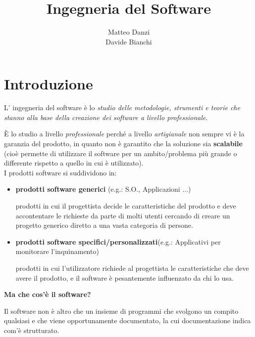\documentclass[a4paper, 10pt]{article}
\title{Ingegneria del Software}
\date{}
\author{Matteo Danzi \\Davide Bianchi}
\begin{document}
	\maketitle
	
	\tableofcontents
	
	\newpage
	
	\section{Introduzione}
	L' ingegneria del software è lo \textit{studio delle metodologie, strumenti e teorie che
		stanno alla base della creazione dei software a livello professionale}.
	
	\noindent
	È lo studio a livello \textit{professionale} perché a livello \textit{artigianale} non sempre vi è la garanzia del prodotto, in quanto non è garantito che la soluzione sia \textbf{scalabile} (cioè
	permette di utilizzare il software per un ambito/problema più grande o differente rispetto a quello in cui è utilizzato).\\
	I prodotti software si suddividono in:
	\begin{itemize}
		\item \textbf{prodotti software generici} (e.g.: S.O., Applicazioni ...)
		
		prodotti in cui il progettista decide le caratteristiche del prodotto e deve accontentare le richieste da parte di molti utenti cercando di creare un progetto generico diretto a  una vasta categoria di persone.
		\item \textbf{prodotti software specifici/personalizzati}(e.g.: Applicativi per monitorare l'inquinamento)
		
		prodotti in cui l'utilizzatore richiede al progettista le caratteristiche che deve avere il prodotto, e il software è pesantemente influenzato da chi lo usa.
	\end{itemize}
	
	\noindent
	\textbf{Ma che cos'è il software?} 
	
	\noindent
	Il software non è altro che un insieme di programmi che svolgono un compito qualsiasi e che viene opportunamente documentato, la cui documentazione indica com'è strutturato. \\
	
	\noindent
\end{document}
